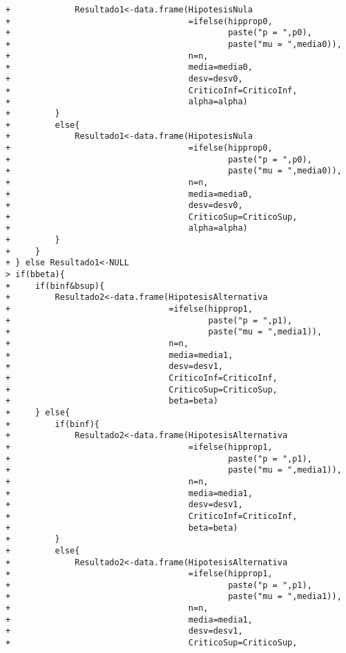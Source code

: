 \begin{solucion}
\begin{verbatim}
+             Resultado1<-data.frame(HipotesisNula
+                                    =ifelse(hipprop0,
+                                            paste("p = ",p0),
+                                            paste("mu = ",media0)),
+                                    n=n,
+                                    media=media0,
+                                    desv=desv0,
+                                    CriticoInf=CriticoInf,
+                                    alpha=alpha)
+         }
+         else{
+             Resultado1<-data.frame(HipotesisNula
+                                    =ifelse(hipprop0,
+                                            paste("p = ",p0),
+                                            paste("mu = ",media0)),
+                                    n=n,
+                                    media=media0,
+                                    desv=desv0,
+                                    CriticoSup=CriticoSup,
+                                    alpha=alpha)
+         }
+     }
+ } else Resultado1<-NULL
> if(bbeta){
+     if(binf&bsup){
+         Resultado2<-data.frame(HipotesisAlternativa
+                                =ifelse(hipprop1,
+                                        paste("p = ",p1),
+                                        paste("mu = ",media1)),
+                                n=n,
+                                media=media1,
+                                desv=desv1,
+                                CríticoInf=CriticoInf,
+                                CriticoSup=CriticoSup,
+                                beta=beta)
+     } else{
+         if(binf){
+             Resultado2<-data.frame(HipotesisAlternativa
+                                    =ifelse(hipprop1,
+                                            paste("p = ",p1),
+                                            paste("mu = ",media1)),
+                                    n=n,
+                                    media=media1,
+                                    desv=desv1,
+                                    CriticoInf=CriticoInf,
+                                    beta=beta)
+         }
+         else{
+             Resultado2<-data.frame(HipotesisAlternativa
+                                    =ifelse(hipprop1,
+                                            paste("p = ",p1),
+                                            paste("mu = ",media1)),
+                                    n=n,
+                                    media=media1,
+                                    desv=desv1,
+                                    CriticoSup=CriticoSup,

\end{verbatim}
\end{solucion}
